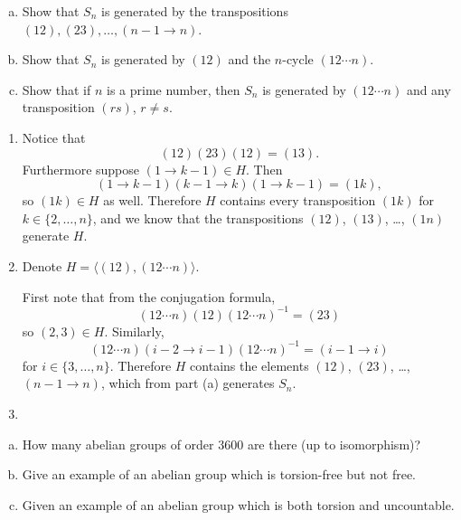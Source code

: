\documentclass{article}
\newcounter{Problem}
\newenvironment{Problem}{\begin{Exercise}[name={Problem},
                                          counter={Problem}]}
                        {\end{Exercise}}
\begin{document}
\pagebreak

\begin{Problem}
  \begin{enumerate}[(a)]
    \item{
      Show that $S_n$ is generated by the transpositions
      $(12),(23),\dots,(n-1 \to n)$.
    }
    \item{
      Show that $S_n$ is generated by $(12)$ and the $n$-cycle
      $(12 \cdots n)$.
    }
    \item{
      Show that if $n$ is a prime number, then $S_n$ is generated by
      $(1 2 \cdots n)$ and any transposition $(rs)$, $r \neq s$.
    }
  \end{enumerate}
\end{Problem}

\begin{Answer}
\begin{enumerate}
  \item{
    Notice that
    $$
    (12)(23)(12) = (13).
    $$
    Furthermore suppose $(1 \to k - 1) \in H$. Then
    $$
    (1 \to k - 1)(k - 1 \to k)(1 \to k - 1) =
    (1k),
    $$
    so $(1k) \in H$ as well.
    Therefore $H$ contains every transposition $(1k)$ for
    $k \in \{ 2, \dots, n \}$, and we know that the transpositions
    $(12)$, $(13)$, \dots, $(1n)$ generate $H$.
  }
  \item{
    Denote $H = \langle (1 2), (1 2 \cdots n) \rangle$.

    First note that from the conjugation formula,
    $$
    (1 2 \cdots n)(1 2)(1 2 \cdots n)^{-1} = (2 3)
    $$
    so $(2, 3) \in H$.
    Similarly,
    $$
    (1 2 \cdots n)(i - 2 \to i - 1)(1 2 \cdots n)^{-1}
    = (i - 1 \to i)
    $$
    for $i \in \{ 3, \dots, n \}$.
    Therefore $H$ contains the elements
    $(12)$, $(23)$, \dots, $(n-1 \to n)$, which from part (a)
    generates $S_n$.
  }
  \item{
  }
\end{enumerate}
\end{Answer}

\pagebreak

\begin{Problem}
\begin{enumerate}[(a)]
  \item{
    How many abelian groups of order 3600 are there (up to isomorphism)?
  }
  \item{
    Give an example of an abelian group which is torsion-free but not free.
  }
  \item{
    Given an example of an abelian group which is both torsion and uncountable.
  }
\end{enumerate}
\end{Problem}
\end{document}
